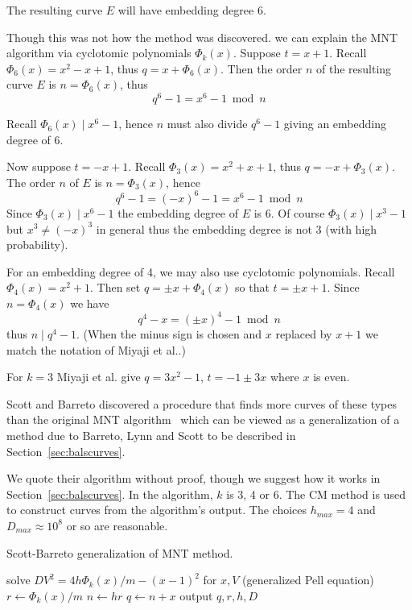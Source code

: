 The resulting curve $E$ will have embedding degree 6.

Though this was not how the method was discovered.
we can explain the MNT algorithm via cyclotomic polynomials $\Phi_k(x)$.
Suppose $t = x + 1$.
Recall $\Phi_6(x) = x^2 - x + 1$, thus
$q = x + \Phi_6(x)$.
Then the order $n$ of the resulting
curve $E$ is $n = \Phi_6(x)$, thus
\[ q^6 - 1 = x^6 - 1 \bmod n \]

Recall $\Phi_6(x) \mid x^6 - 1$, hence $n$ must also divide $q^6 - 1$
giving an embedding degree of 6.

Now suppose $t = -x + 1$.
Recall $\Phi_3(x) = x^2 + x + 1$, thus
$q = -x + \Phi_3(x)$.
The order $n$ of $E$ is $n = \Phi_3(x)$, hence
\[ q^6 - 1 = (-x)^6 - 1 = x^6 - 1 \bmod n \]
Since $\Phi_3(x) \mid x^6 - 1$ the embedding degree of $E$ is 6.
Of course $\Phi_3(x) \mid x^3 - 1$ but $x^3 \ne (-x)^3$ in general
thus the embedding degree is not 3 (with high probability).

For an embedding degree of 4, we may also use cyclotomic polynomials.
Recall $\Phi_4(x) = x^2 + 1$. Then set $q = \pm x + \Phi_4(x)$
so that $t = \pm x + 1$. Since $n = \Phi_4(x)$ we have
\[ q^4 - x = (\pm x)^4 - 1 \bmod n \]
thus $n \mid q^4 - 1$.
(When the minus sign is chosen and $x$ replaced by $x+1$ 
we match the notation of Miyaji et al.\cite{mnt}.)

For $k=3$ Miyaji et al. give $q = 3 x^2 - 1$, $t = -1 \pm 3x$ where $x$ is
even.

Scott and Barreto discovered a procedure that finds more curves of these
types than the original MNT algorithm~\cite{moremnt}
which can be viewed as a generalization of a method due to
Barreto, Lynn and Scott to be described in Section~\ref{sec:balscurves}.

We quote their algorithm without proof, though we suggest how it works
in Section~\ref{sec:balscurves}. In the algorithm, $k$ is 3, 4 or 6.
The CM method is used to construct curves from the algorithm's output.
The choices $h_{max} = 4$ and $D_{max} \approx 10^8$ or so are reasonable.

\begin{algorithm}
\caption {Scott-Barreto generalization of MNT method.}
\begin{algorithmic}[1]
	    \STATE solve $DV^2 = 4 h \Phi_k(x) / m - (x-1)^2$ for $x, V$ (generalized Pell equation)
	    \STATE $r\gets \Phi_k(x) /m$
	    \STATE $n\gets hr$
	    \STATE $q\gets n + x$
		\STATE output $q, r, h, D$
	    \ENDIF
	\ENDFOR
    \ENDFOR
\ENDFOR
\end{algorithmic}
\end{algorithm}

